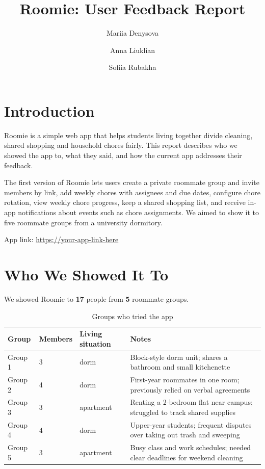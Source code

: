 \documentclass[11pt,a4paper]{article}
\title{Roomie: User Feedback Report}
\author{Mariia Denysova \and Anna Liuklian \and Sofiia Rubakha}
\date{}
\begin{document}
\maketitle

\section{Introduction}
Roomie is a simple web app that helps students living together divide cleaning,
shared shopping and household chores fairly. This report describes who we showed
the app to, what they said, and how the current app addresses their feedback.

The first version of Roomie lets users create a private roommate group and invite
members by link, add weekly chores with assignees and due dates, configure chore
rotation, view weekly chore progress, keep a shared shopping list, and receive
in-app notifications about events such as chore assignments. We aimed to show it to five roommate groups from a university
dormitory.

App link: \url{https://your-app-link-here}

\section{Who We Showed It To}
We showed Roomie to \textbf{17} people from \textbf{5} roommate groups.

\begin{table}[h]
\centering
\begin{tabularx}{\textwidth}{l l l X}
\toprule
\textbf{Group} & \textbf{Members} & \textbf{Living situation} & \textbf{Notes} \\
\midrule
Group 1 & 3 & dorm & Block-style dorm unit; shares a bathroom and small kitchenette \\
Group 2 & 4 & dorm & First-year roommates in one room; previously relied on verbal agreements \\
Group 3 & 3 & apartment & Renting a 2-bedroom flat near campus; struggled to track shared supplies \\
Group 4 & 4 & dorm & Upper-year students; frequent disputes over taking out trash and sweeping \\
Group 5 & 3 & apartment & Busy class and work schedules; needed clear deadlines for weekend cleaning \\
\bottomrule
\end{tabularx}
\caption{Groups who tried the app}
\end{table}
\end{document}
